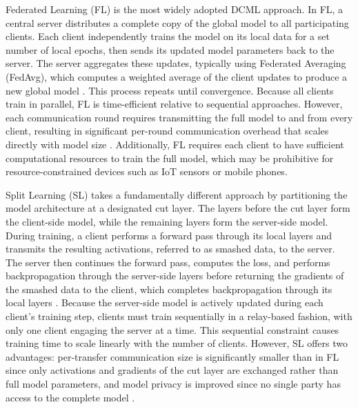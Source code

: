 \documentclass[12pt]{article}
\begin{document}
Federated Learning (FL) is the most widely adopted DCML approach. In FL, a central server distributes a complete copy of the global model to all participating clients. Each client independently trains the model on its local data for a set number of local epochs, then sends its updated model parameters back to the server. The server aggregates these updates, typically using Federated Averaging (FedAvg), which computes a weighted average of the client updates to produce a new global model \cite{mcmahan2017}. This process repeats until convergence. Because all clients train in parallel, FL is time-efficient relative to sequential approaches. However, each communication round requires transmitting the full model to and from every client, resulting in significant per-round communication overhead that scales directly with model size \cite{thapa2022}. Additionally, FL requires each client to have sufficient computational resources to train the full model, which may be prohibitive for resource-constrained devices such as IoT sensors or mobile phones.

Split Learning (SL) takes a fundamentally different approach by partitioning the model architecture at a designated cut layer. The layers before the cut layer form the client-side model, while the remaining layers form the server-side model. During training, a client performs a forward pass through its local layers and transmits the resulting activations, referred to as smashed data, to the server. The server then continues the forward pass, computes the loss, and performs backpropagation through the server-side layers before returning the gradients of the smashed data to the client, which completes backpropagation through its local layers \cite{vepakomma2018}. Because the server-side model is actively updated during each client's training step, clients must train sequentially in a relay-based fashion, with only one client engaging the server at a time. This sequential constraint causes training time to scale linearly with the number of clients. However, SL offers two advantages: per-transfer communication size is significantly smaller than in FL since only activations and gradients of the cut layer are exchanged rather than full model parameters, and model privacy is improved since no single party has access to the complete model \cite{thapa2022}.
\end{document}
